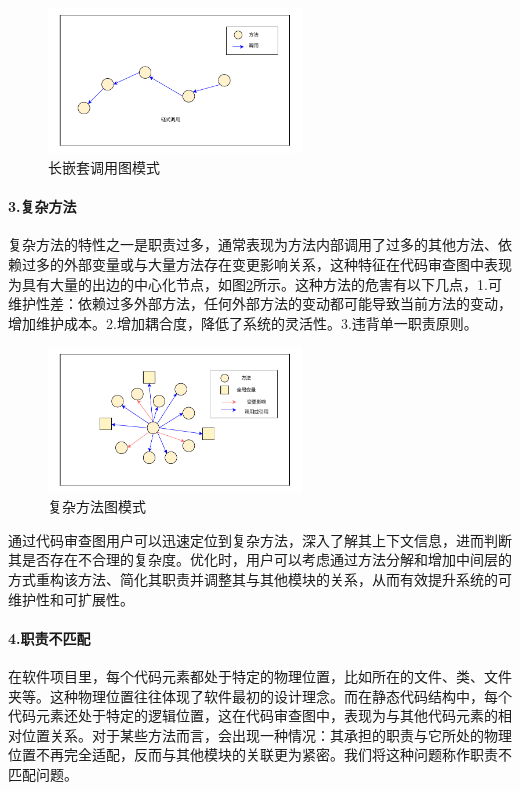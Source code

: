 \begin{figure}[h]
\centering
\includegraphics[width = 0.6\textwidth]{figures/链式调用模式图_2.pdf}
\caption{长嵌套调用图模式}
\label{1_长嵌套调用图模式}
\end{figure}




\paragraph{3.复杂方法} 复杂方法的特性之一是职责过多，通常表现为方法内部调用了过多的其他方法、依赖过多的外部变量或与大量方法存在变更影响关系，这种特征在代码审查图中表现为具有大量的出边的中心化节点，如图\ref{1_复杂方法图模式}所示。这种方法的危害有以下几点，1.可维护性差：依赖过多外部方法，任何外部方法的变动都可能导致当前方法的变动，增加维护成本。2.增加耦合度，降低了系统的灵活性。3.违背单一职责原则。

\begin{figure}[h]
\centering
\includegraphics[width = 0.6\textwidth]{figures/复杂方法_2.pdf}
\caption{复杂方法图模式}
\label{1_复杂方法图模式}
\end{figure}



通过代码审查图用户可以迅速定位到复杂方法，深入了解其上下文信息，进而判断其是否存在不合理的复杂度。优化时，用户可以考虑通过方法分解和增加中间层的方式重构该方法、简化其职责并调整其与其他模块的关系，从而有效提升系统的可维护性和可扩展性。


\paragraph{4.职责不匹配} 在软件项目里，每个代码元素都处于特定的物理位置，比如所在的文件、类、文件夹等。这种物理位置往往体现了软件最初的设计理念。而在静态代码结构中，每个代码元素还处于特定的逻辑位置，这在代码审查图中，表现为与其他代码元素的相对位置关系。对于某些方法而言，会出现一种情况：其承担的职责与它所处的物理位置不再完全适配，反而与其他模块的关联更为紧密。我们将这种问题称作职责不匹配问题。


